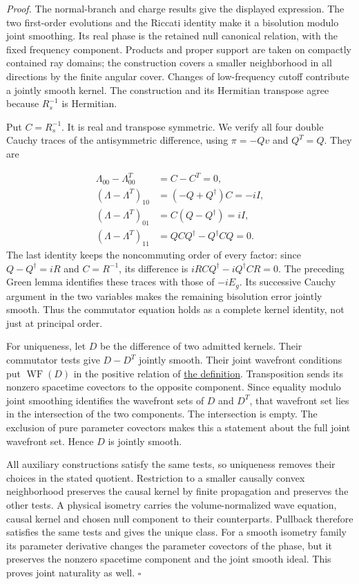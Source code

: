 \documentclass[
  english,
  11pt,
  reqno]{amsart}
\begin{document}
\emph{Proof.} The normal-branch and charge results give the displayed
expression. The two first-order evolutions and the Riccati identity make
it a bisolution modulo joint smoothing. Its real phase is the retained
null canonical relation, with the fixed frequency component. Products
and proper support are taken on compactly contained ray domains; the
construction covers a smaller neighborhood in all directions by the
finite angular cover. Changes of low-frequency cutoff contribute a
jointly smooth kernel. The construction and its Hermitian transpose
agree because \(R_s^{-1}\) is Hermitian.

Put \(C=R_s^{-1}\). It is real and transpose symmetric. We verify all
four double Cauchy traces of the antisymmetric difference, using
\(\pi=-Qv\) and \(Q^T=Q\). They are

\label{eq:online-wave-commutator-four-traces} \[
\begin{aligned}
\Lambda_{00}-\Lambda_{00}^T&=C-C^T=0,\\
(\Lambda-\Lambda^T)_{10}
&=(-Q+Q^\dagger)C=-iI,\\
(\Lambda-\Lambda^T)_{01}
&=C(Q-Q^\dagger)=iI,\\
(\Lambda-\Lambda^T)_{11}
&=QCQ^\dagger-Q^\dagger CQ=0.
\end{aligned}
\] The last identity keeps the noncommuting order of every factor: since
\(Q-Q^\dagger=iR\) and \(C=R^{-1}\), its difference is
\(iRCQ^\dagger-iQ^\dagger CR=0\). The preceding Green lemma identifies
these traces with those of \(-iE_g\). Its successive Cauchy argument in
the two variables makes the remaining bisolution error jointly smooth.
Thus the commutator equation holds as a complete kernel identity, not
just at principal order.

For uniqueness, let \(D\) be the difference of two admitted kernels.
Their commutator tests give \(D-D^T\) jointly smooth. Their joint
wavefront conditions put \(\operatorname{WF}(D)\) in the positive
relation of \hyperref[eq:online-wave-joint-positive-relation]{the
definition}. Transposition sends its nonzero spacetime covectors to the
opposite component. Since equality modulo joint smoothing identifies the
wavefront sets of \(D\) and \(D^T\), that wavefront set lies in the
intersection of the two components. The intersection is empty. The
exclusion of pure parameter covectors makes this a statement about the
full joint wavefront set. Hence \(D\) is jointly smooth.

All auxiliary constructions satisfy the same tests, so uniqueness
removes their choices in the stated quotient. Restriction to a smaller
causally convex neighborhood preserves the causal kernel by finite
propagation and preserves the other tests. A physical isometry carries
the volume-normalized wave equation, causal kernel and chosen null
component to their counterparts. Pullback therefore satisfies the same
tests and gives the unique class. For a smooth isometry family its
parameter derivative changes the parameter covectors of the phase, but
it preserves the nonzero spacetime component and the joint smooth ideal.
This proves joint naturality as well. \hfill\(\square\)
\end{document}
